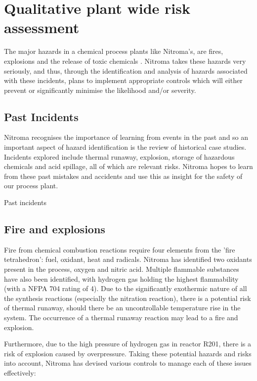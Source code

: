 \section{Qualitative plant wide risk assessment}

The major hazards in a chemical process plants like Nitroma’s, are fires, explosions and the release of toxic chemicals \cite{mannan_lees_2012}. Nitroma takes these hazards very seriously, and thus, through the identification and analysis of hazards associated with these incidents, plans to implement appropriate controls which will either prevent or significantly minimise the likelihood and/or severity. 


\subsection{Past Incidents}

Nitroma recognises the importance of learning from events in the past and so an important aspect of hazard identification is the review of historical case studies. Incidents explored include thermal runaway, explosion, storage of hazardous chemicals and acid spillage, all of which are relevant risks. Nitroma hopes to learn from these past mistakes and accidents and use this as insight for the safety of our process plant.

\begin{table}[h]
    \caption{Past incidents}
    
\end{table}

\subsection{Fire and explosions}

Fire from chemical combustion reactions require four elements from the 'fire tetrahedron': fuel, oxidant, heat and radicals. Nitroma has identified two oxidants present in the process, oxygen and nitric acid. Multiple flammable substances have also been identified, with hydrogen gas holding the highest flammability (with a NFPA 704 rating of 4). Due to the significantly exothermic nature of all the synthesis reactions (especially the nitration reaction), there is a potential risk of thermal runaway, should there be an uncontrollable temperature rise in the system. The occurrence of a thermal runaway reaction may lead to a fire and explosion.  

Furthermore, due to the high pressure of hydrogen gas in reactor R201, there is a risk of explosion caused by overpressure. Taking these potential hazards and risks into account, Nitroma has devised various controls to manage each of these issues effectively: 


